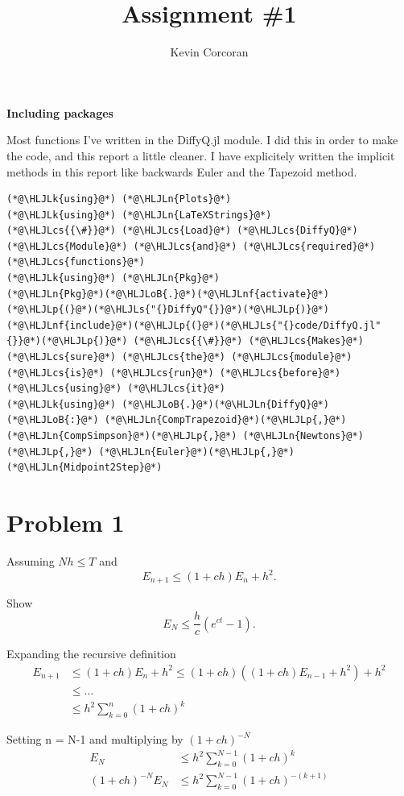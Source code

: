 \documentclass[12pt,a4paper]{article}
\title{ Assignment \#1 }
\author{ Kevin Corcoran }
\newcommand{\HLJLk}[1]{\textcolor[RGB]{148,91,176}{\textbf{#1}}}
\newcommand{\HLJLn}[1]{#1}
\newcommand{\HLJLnf}[1]{\textcolor[RGB]{66,102,213}{#1}}
\newcommand{\HLJLs}[1]{\textcolor[RGB]{201,61,57}{#1}}
\newcommand{\HLJLoB}[1]{\textcolor[RGB]{102,102,102}{\textbf{#1}}}
\newcommand{\HLJLp}[1]{#1}
\newcommand{\HLJLcs}[1]{\textcolor[RGB]{153,153,119}{\textit{#1}}}
\begin{document}
\maketitle

\textbf{Including packages}

Most functions I've written in the DiffyQ.jl module. I did this in order to make the code, and this report a little cleaner. I have explicitely written the implicit methods in this report like backwards Euler and the Tapezoid method.


\begin{lstlisting}
(*@\HLJLk{using}@*) (*@\HLJLn{Plots}@*)
(*@\HLJLk{using}@*) (*@\HLJLn{LaTeXStrings}@*)
(*@\HLJLcs{{\#}}@*) (*@\HLJLcs{Load}@*) (*@\HLJLcs{DiffyQ}@*) (*@\HLJLcs{Module}@*) (*@\HLJLcs{and}@*) (*@\HLJLcs{required}@*) (*@\HLJLcs{functions}@*)
(*@\HLJLk{using}@*) (*@\HLJLn{Pkg}@*)
(*@\HLJLn{Pkg}@*)(*@\HLJLoB{.}@*)(*@\HLJLnf{activate}@*)(*@\HLJLp{(}@*)(*@\HLJLs{"{}DiffyQ"{}}@*)(*@\HLJLp{)}@*)
(*@\HLJLnf{include}@*)(*@\HLJLp{(}@*)(*@\HLJLs{"{}code/DiffyQ.jl"{}}@*)(*@\HLJLp{)}@*) (*@\HLJLcs{{\#}}@*) (*@\HLJLcs{Makes}@*) (*@\HLJLcs{sure}@*) (*@\HLJLcs{the}@*) (*@\HLJLcs{module}@*) (*@\HLJLcs{is}@*) (*@\HLJLcs{run}@*) (*@\HLJLcs{before}@*) (*@\HLJLcs{using}@*) (*@\HLJLcs{it}@*)
(*@\HLJLk{using}@*) (*@\HLJLoB{.}@*)(*@\HLJLn{DiffyQ}@*)(*@\HLJLoB{:}@*) (*@\HLJLn{CompTrapezoid}@*)(*@\HLJLp{,}@*) (*@\HLJLn{CompSimpson}@*)(*@\HLJLp{,}@*) (*@\HLJLn{Newtons}@*)(*@\HLJLp{,}@*) (*@\HLJLn{Euler}@*)(*@\HLJLp{,}@*) (*@\HLJLn{Midpoint2Step}@*)
\end{lstlisting}


\section{Problem 1}
 
Assuming  $Nh\leq T$ and
\[
E_{n+1} \leq (1+ch)E_n + h^2 
.\] 

Show
\[
  E_N \leq \frac{h}{c} \left(e^{ct}-1\right)
.\] 


Expanding the recursive definition
\begin{align*}
  E_{n+1} &\leq (1+ch)E_n + h^2 \leq (1+ch) \left((1+ch)E_{n-1} +h^2\right)
  + h^2 \\
          &\leq \dots \\
          &\leq h^2 \sum^{n}_{k=0} \left(1+ch\right)^k
\end{align*}

Setting n = N-1 and multiplying by $(1+ch)^{-N}$
\begin{align*}
  E_N &\leq h^2 \sum^{N-1}_{k=0} \left(1+ch\right)^k \\
  (1+ch)^{-N}E_N &\leq h^2 \sum^{N-1}_{k=0} \left(1+ch\right)^{-(k+1)}
\end{align*}
\end{document}
